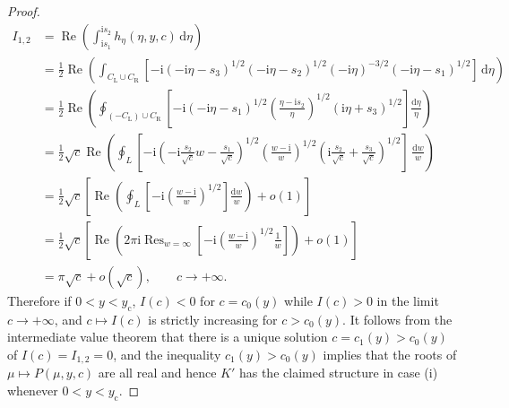 \documentclass[11pt]{article}
\numberwithin{equation}{section}
\numberwithin{equation}{section}
\begin{document}
\begin{proof}
\begin{align*}
I_{1,2}&=\operatorname{Re}\left(\int_{\mathrm{i} s_1}^{\mathrm{i} s_2}h_\eta(\eta,y,c)\,\mathrm{d}\eta\right) \\ &=
\frac{1}{2}\operatorname{Re}\left(\int_{C_\mathrm{L}\cup C_\mathrm{R}}\left[-\mathrm{i}(-\mathrm{i}\eta-s_3)^{1/2}(-\mathrm{i}\eta-s_2)^{1/2}(-\mathrm{i}\eta)^{-3/2}(-\mathrm{i}\eta-s_1)^{1/2}\right]\,\mathrm{d}\eta\right)\\
&=\frac{1}{2}\operatorname{Re}\left(\oint_{(-C_\mathrm{L})\cup C_\mathrm{R}}\left[-\mathrm{i} (-\mathrm{i}\eta-s_1)^{1/2}\left(\frac{\eta-\mathrm{i} s_2}{\eta}\right)^{1/2}(\mathrm{i}\eta+s_3)^{1/2}\right]\frac{\mathrm{d}\eta}{\eta}\right)\\
&=\frac{1}{2}\sqrt{c}\operatorname{Re}\left(\oint_{L}\left[-\mathrm{i}\left(-\mathrm{i}\frac{s_2}{\sqrt{c}}w-\frac{s_1}{\sqrt{c}}\right)^{1/2}\left(\frac{w-\mathrm{i}}{w}\right)^{1/2}\left(\mathrm{i}\frac{s_2}{\sqrt{c}}+\frac{s_3}{\sqrt{c}}\right)^{1/2}\right]\,\frac{\mathrm{d} w}{w}\right)\\
&=\frac{1}{2}\sqrt{c}\left[\operatorname{Re}\left(\oint_L\left[-\mathrm{i}\left(\frac{w-\mathrm{i}}{w}\right)^{1/2}\right]\frac{\mathrm{d} w}{w}\right)+o(1)\right] \\ %
&=\frac{1}{2}\sqrt{c}\left[\operatorname{Re}\left(2\pi\mathrm{i}\mathop{\mathrm{Res}}_{w=\infty}
\left[-\mathrm{i}\left(\frac{w-\mathrm{i}}{w}\right)^{1/2}\frac{1}{w}\right]\right)+o(1)\right] \\ %
&=\pi\sqrt{c}+o(\sqrt{c}),\qquad c\to+\infty.
\end{align*}
Therefore if $0<y<y_\mathrm{c}$, $I(c)<0$ for $c=c_0(y)$ while $I(c)>0$ in the limit $c\to+\infty$, and $c\mapsto I(c)$ is strictly increasing for $c>c_0(y)$. It follows from the intermediate value theorem that there is a unique solution $c=c_1(y)>c_0(y)$ of $I(c)=I_{1,2}=0$, and the inequality $c_1(y)>c_0(y)$ implies that the roots of $\mu\mapsto P(\mu,y,c)$ are all real and hence $K'$ has the claimed structure in case (i) whenever $0<y<y_\mathrm{c}$.


\end{proof}
\end{document}
